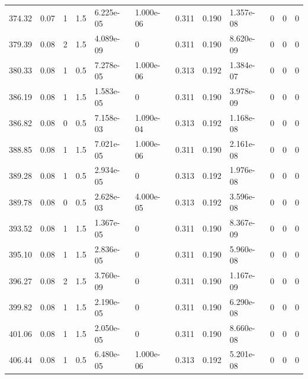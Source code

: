 \documentclass[preview]{standalone}
\begin{document}
{{{\begin{tabular}{L{1.2cm}C{1.2cm} C{0.3cm}C{0.5cm} C{1.4cm}C{1.4cm} C{1.4cm}C{1.4cm} C{1.6cm}C{1.6cm} C{1.6cm}C{1.6cm}}
  374.32  &  0.07  & 1     & 1.5 &  6.225e-05  & 1.000e-06  &  0.311&   0.190& 1.357e-08 & 0   &  0 & 0  \\ 
  379.39  &  0.08  & 2     & 1.5 &  4.089e-09  & 0  &  0.311&   0.190& 8.620e-09 & 0   &  0 & 0  \\ 
  380.33  &  0.08  & 1     & 0.5 &  7.278e-05  & 1.000e-06  &  0.313&   0.192& 1.384e-07 & 0   &  0 & 0  \\ 
  386.19  &  0.08  & 1     & 1.5 &  1.583e-05  & 0  &  0.311&   0.190& 3.978e-09 & 0   &  0 & 0  \\ 
  386.82  &  0.08  & 0     & 0.5 &  7.158e-03  & 1.090e-04  &  0.313&   0.192& 1.168e-08 & 0   &  0 & 0  \\ 
  388.85  &  0.08  & 1     & 1.5 &  7.021e-05  & 1.000e-06  &  0.311&   0.190& 2.161e-08 & 0   &  0 & 0  \\ 
  389.28  &  0.08  & 1     & 0.5 &  2.934e-05  & 0  &  0.313&   0.192& 1.976e-08 & 0   &  0 & 0  \\ 
  389.78  &  0.08  & 0     & 0.5 &  2.628e-03  & 4.000e-05  &  0.313&   0.192& 3.596e-08 & 0   &  0 & 0  \\ 
  393.52  &  0.08  & 1     & 1.5 &  1.367e-05  & 0  &  0.311&   0.190& 8.367e-09 & 0   &  0 & 0  \\ 
  395.10  &  0.08  & 1     & 1.5 &  2.836e-05  & 0  &  0.311&   0.190& 5.960e-08 & 0   &  0 & 0  \\ 
  396.27  &  0.08  & 2     & 1.5 &  3.760e-09  & 0  &  0.311&   0.190& 1.167e-09 & 0   &  0 & 0  \\ 
  399.82  &  0.08  & 1     & 1.5 &  2.190e-05  & 0  &  0.311&   0.190& 6.290e-08 & 0   &  0 & 0  \\ 
  401.06  &  0.08  & 1     & 1.5 &  2.050e-05  & 0  &  0.311&   0.190& 8.660e-08 & 0   &  0 & 0  \\ 
  406.44  &  0.08  & 1     & 0.5 &  6.480e-05  & 1.000e-06  &  0.313&   0.192& 5.201e-08 & 0   &  0 & 0  \\ 
\hline 
\end{tabular} 

}}}
\end{document}
